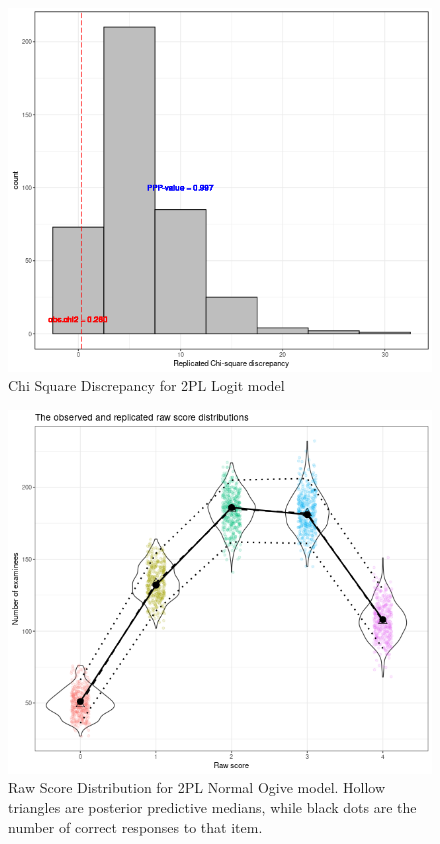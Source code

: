 \documentclass[12pt]{article}
\begin{document}
\begin{figure}[h]
\vspace{-0.5cm}
  \centering
  \includegraphics[width=1\columnwidth]{Plots/Plots_2PL_Logit/chi_sqaure.png}
  \caption{Chi Square Discrepancy for 2PL Logit model}
  \label{2pl_logit_chi_squar}
\end{figure}

\begin{figure}[h]
\vspace{-0.5cm}
  \centering
  \includegraphics[width=1\columnwidth]{Plots/Plots_2PL_Ogive/raw_score_dist.png}
  \caption{Raw Score Distribution for 2PL Normal Ogive model. Hollow triangles are posterior predictive medians, while black dots are the number of correct responses to that item.}
  \label{2pl_ogive_raw_score}
\end{figure}
\end{document}
